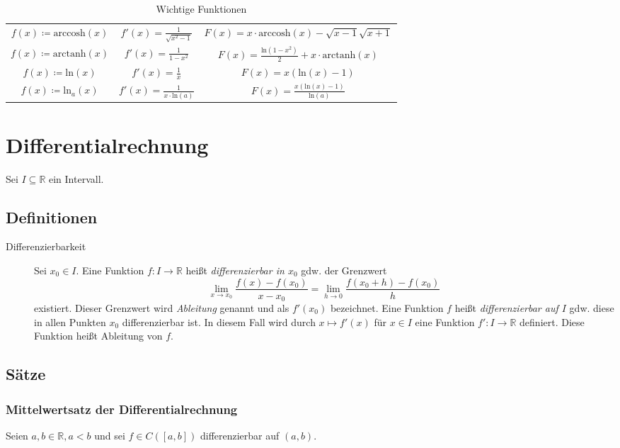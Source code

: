 \begin{table}[ht]
\begin{tabular}{| c | c | c |}
				$ f(x) \coloneqq \text{arccosh}(x) $ & $ f'(x) = \frac{1}{\sqrt{x ^ 2 - 1}} $     & $ F(x) = x \cdot \text{arccosh}(x) - \sqrt{x - 1} \sqrt{x + 1} $      \\
				$ f(x) \coloneqq \text{arctanh}(x) $ & $ f'(x) = \frac{1}{1 - x ^ 2} $            & $ F(x) = \frac{\text{ln}(1 - x ^ 2)}{2} + x \cdot \text{arctanh}(x) $ \\
				$ f(x) \coloneqq \text{ln}(x) $      & $ f'(x) = \frac{1}{x} $                    & $ F(x) = x (\text{ln}(x) - 1) $                                       \\
				$ f(x) \coloneqq \text{ln} _ a (x) $ & $ f'(x) = \frac{1}{x \cdot \text{ln}(a)} $ & $ F(x) = \frac{x (\text{ln}(x) - 1)}{\text{ln}(a)} $                  \\
				\hline
			\end{tabular}
			\caption{Wichtige Funktionen}
		\end{table}

\chapter{Differentialrechnung}
	Sei $ I \subseteq \mathbb{R} $ ein Intervall.

	\section{Definitionen}
		\begin{description}
			\item[Differenzierbarkeit] Sei $ x _ 0 \in I $. Eine Funktion $ f : I \rightarrow \mathbb{R} $ heißt \textit{differenzierbar in $ x _ 0 $} gdw. der Grenzwert \[ \lim _ { x \rightarrow x _ 0 } \frac{f(x) - f(x _ 0)}{x - x _ 0} = \lim _ { h \rightarrow 0 } \frac{f(x _ 0 + h) - f(x _ 0)}{h} \] existiert. Dieser Grenzwert wird \textit{Ableitung} genannt und als $ f'(x _ 0) $ bezeichnet. Eine Funktion $ f $ heißt \textit{differenzierbar auf $ I $} gdw. diese in allen Punkten $ x _ 0 $ differenzierbar ist. In diesem Fall wird durch $ x \mapsto f'(x) $ für $ x \in I $ eine Funktion $ f' : I \rightarrow \mathbb{R} $ definiert. Diese Funktion heißt Ableitung von $ f $.
		\end{description}

	\section{Sätze}
		\subsection{Mittelwertsatz der Differentialrechnung}
			Seien $ a, b \in \mathbb{R}, a < b $ und sei $ f \in C([a, b]) $ differenzierbar auf $ (a, b) $.

